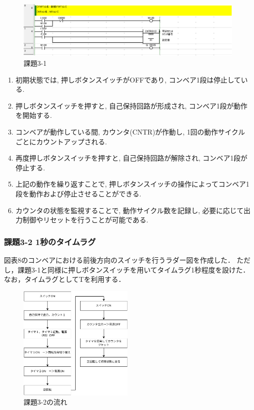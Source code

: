 \begin{figure}[H]
  \centering
  \includegraphics[scale=1]{sozai/3-1-crop.pdf}
  \caption{課題3-1}
\end{figure}
\begin{enumerate}
  \item 初期状態では, 押しボタンスイッチがOFFであり, コンベア1段は停止している.
  \item 押しボタンスイッチを押すと, 自己保持回路が形成され, コンベア1段が動作を開始する.
  \item コンベアが動作している間, カウンタ(CNTR)が作動し, 1回の動作サイクルごとにカウントアップされる.
  \item 再度押しボタンスイッチを押すと, 自己保持回路が解除され, コンベア1段が停止する.
  \item 上記の動作を繰り返すことで, 押しボタンスイッチの操作によってコンベア1段を動作および停止させることができる.
  \item カウンタの状態を監視することで, 動作サイクル数を記録し, 必要に応じて出力制御やリセットを行うことが可能である.
\end{enumerate}

\subsubsection*{課題3-2 1秒のタイムラグ}
図表8のコンベアにおける前後方向のスイッチを行うラダー図を作成した．
ただし，課題3-1と同様に押しボタンスイッチを用いてタイムラグ1秒程度を設けた．
なお，タイムラグとしてTを利用する．

\begin{figure}[H]
  \centering
  \includegraphics[width=0.5\textwidth]{sozai/12.pdf}
  \caption{課題3-2の流れ}
\end{figure}

